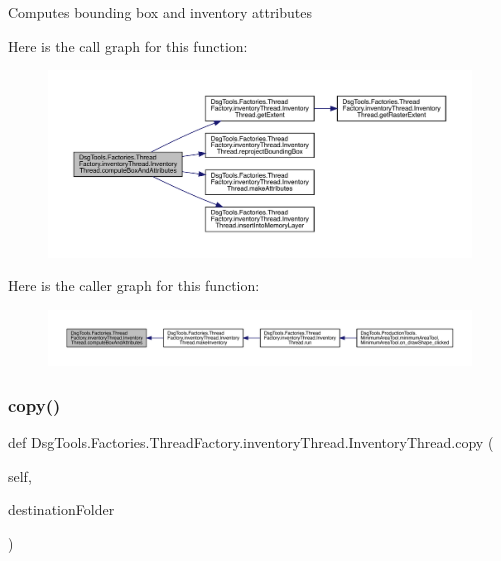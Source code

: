 \begin{DoxyVerb}Computes bounding box and inventory attributes
\end{DoxyVerb}
 Here is the call graph for this function\+:
\nopagebreak
\begin{figure}[H]
\begin{center}
\leavevmode
\includegraphics[width=350pt]{class_dsg_tools_1_1_factories_1_1_thread_factory_1_1inventory_thread_1_1_inventory_thread_af49e888ae1d1e120bebcdf620730c1b1_cgraph}
\end{center}
\end{figure}
Here is the caller graph for this function\+:
\nopagebreak
\begin{figure}[H]
\begin{center}
\leavevmode
\includegraphics[width=350pt]{class_dsg_tools_1_1_factories_1_1_thread_factory_1_1inventory_thread_1_1_inventory_thread_af49e888ae1d1e120bebcdf620730c1b1_icgraph}
\end{center}
\end{figure}
\mbox{\label{class_dsg_tools_1_1_factories_1_1_thread_factory_1_1inventory_thread_1_1_inventory_thread_a1dd2d109fee4f8015236e57b54caea5a}} 
\subsubsection{\texorpdfstring{copy()}{copy()}}
{\footnotesize\ttfamily def Dsg\+Tools.\+Factories.\+Thread\+Factory.\+inventory\+Thread.\+Inventory\+Thread.\+copy (\begin{DoxyParamCaption}\item[{}]{self,  }\item[{}]{destination\+Folder }\end{DoxyParamCaption})}

